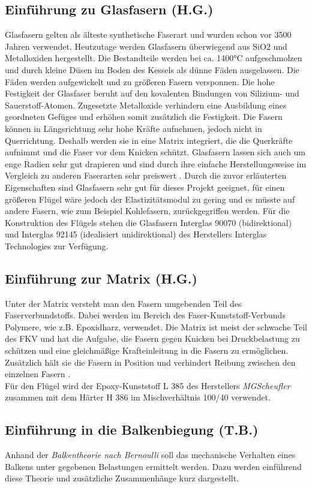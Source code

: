 \subsection{Einführung zu Glasfasern (H.G.)}
\label{Glasfaser}
Glasfasern gelten als älteste synthetische Faserart und wurden schon vor 3500 Jahren verwendet. Heutzutage werden Glasfasern überwiegend aus SiO2 und Metalloxiden hergestellt. Die Bestandteile werden bei ca. 1400°C aufgeschmolzen und durch kleine Düsen im Boden des Kessels als dünne Fäden ausgelassen. Die Fäden werden aufgewickelt und zu größeren Fasern versponnen\cite{item3}.
Die hohe Festigkeit der Glasfaser beruht auf den kovalenten Bindungen von Silizium- und Sauerstoff-Atomen. Zugesetzte Metalloxide verhindern eine Ausbildung eines geordneten Gefüges und erhöhen somit zusätzlich die Festigkeit. Die Fasern können in Längsrichtung sehr hohe Kräfte aufnehmen, jedoch nicht in Querrichtung. Deshalb werden sie in eine Matrix integriert, die die Querkräfte aufnimmt und die Faser vor dem Knicken schützt. Glasfasern lassen sich auch um enge Radien sehr gut drapieren und sind durch ihre einfache Herstellungsweise im Vergleich zu anderen Faserarten sehr preiswert \cite{item4}.
Durch die zuvor erläuterten Eigenschaften sind Glasfasern sehr gut für dieses Projekt geeignet, für einen größeren Flügel wäre jedoch der Elastizitätsmodul zu gering und es müsste auf andere Fasern, wie zum Beispiel Kohlefasern, zurückgegriffen werden. 
Für die Konstruktion des Flügels stehen die Glasfasern Interglas 90070 (bidirektional) und Interglas 92145 (idealisiert unidirektional) des Herstellers Interglas Technologies zur Verfügung. 
\parskip
\parskip
\subsection{Einführung zur Matrix (H.G.)}
Unter der Matrix versteht man den Fasern umgebenden Teil des Faserverbundstoffs. Dabei werden im Bereich des Faser-Kunststoff-Verbunds Polymere, wie z.B. Epoxidharz, verwendet. Die Matrix ist meist der schwache Teil des FKV und hat die Aufgabe, die Fasern gegen Knicken bei Druckbelastung zu schützen und eine gleichmäßige Krafteinleitung in die Fasern zu ermöglichen. Zusätzlich hält sie die Fasern in Position und verhindert Reibung zwischen den einzelnen Fasern \cite{item3}.\\
Für den Flügel wird der Epoxy-Kunststoff L 385 des Herstellers \textit{MGScheufler} zusammen mit dem Härter H 386 im Mischverhältnis 100/40 verwendet.
\newpage

\subsection{Einführung in die Balkenbiegung (T.B.)}\label{Balken}
Anhand der \textit{Balkentheorie nach Bernoulli} soll das mechanische Verhalten eines Balkens unter gegebenen Belastungen ermittelt werden. Dazu werden einführend diese Theorie und zusätzliche Zusammenhänge kurz dargestellt.\\

